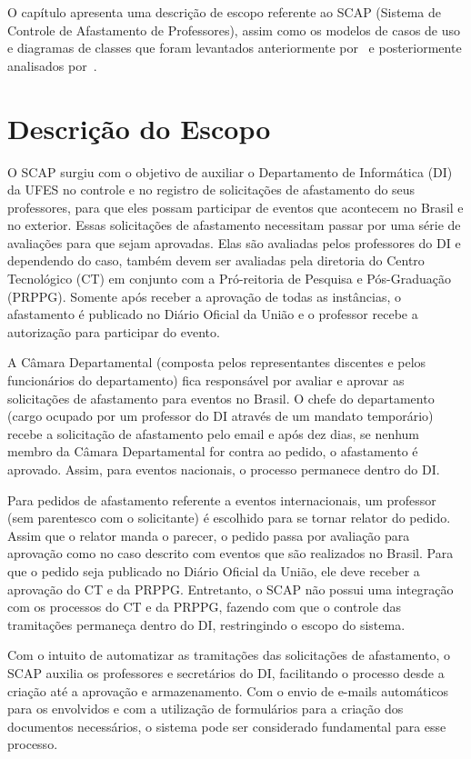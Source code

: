 O capítulo apresenta uma descrição de escopo referente ao SCAP (Sistema de Controle de Afastamento de Professores), assim como os modelos de casos de uso e diagramas de classes que foram levantados anteriormente por~ e posteriormente analisados por~. 

\section{Descrição do Escopo}
\label{sec-requisitos-descricao-escopo}

O SCAP surgiu com o objetivo de auxiliar o Departamento de Informática (DI) da UFES no controle e no registro de solicitações de afastamento do seus professores, para que eles possam participar de eventos que acontecem no Brasil e no exterior. Essas solicitações de afastamento necessitam passar por uma série de avaliações para que sejam aprovadas. Elas são avaliadas pelos professores do DI e dependendo do caso, também devem ser avaliadas pela diretoria do Centro Tecnológico (CT) em conjunto com a Pró-reitoria de Pesquisa e Pós-Graduação (PRPPG). Somente após receber a aprovação de todas as instâncias, o afastamento é publicado no Diário Oficial da União e o professor recebe a autorização para participar do evento.     

A Câmara Departamental (composta pelos representantes discentes e pelos funcionários do departamento) fica responsável por avaliar e aprovar as solicitações de afastamento para eventos no Brasil. O chefe do departamento (cargo ocupado por um professor do DI através de um mandato temporário) recebe a solicitação de afastamento pelo email e após dez dias, se nenhum membro da Câmara Departamental for contra ao pedido, o afastamento é aprovado. Assim, para eventos nacionais, o processo permanece dentro do DI.

Para pedidos de afastamento referente a eventos internacionais, um professor (sem parentesco com o solicitante) é escolhido para se tornar relator do pedido. Assim que o relator manda o parecer, o pedido passa por avaliação para aprovação como no caso descrito com eventos que são realizados no Brasil. Para que o pedido seja publicado no Diário Oficial da União, ele deve receber a aprovação do CT e da PRPPG. Entretanto, o SCAP não possui uma integração com os processos do CT e da PRPPG, fazendo com que o controle das tramitações permaneça dentro do DI, restringindo o escopo do sistema.

Com o intuito de automatizar as tramitações das solicitações de afastamento, o SCAP auxilia os professores e secretários do DI, facilitando o processo desde a criação até a aprovação e armazenamento. Com o envio de e-mails automáticos para os envolvidos e com a utilização de formulários para a criação dos documentos necessários, o sistema pode ser considerado fundamental para esse processo.      

